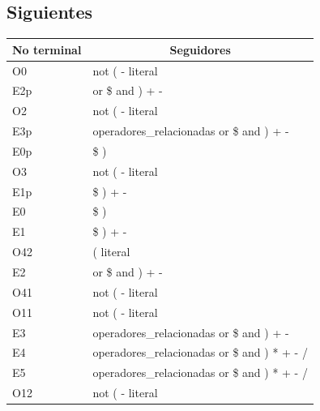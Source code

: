 \documentclass{article}
\begin{document}
\subsection{Siguientes}

\begin{tabular}{|l|l|}
	\hline
	\multicolumn{1}{|c|}{No terminal} & \multicolumn{1}{c|}{Seguidores} \\ \hline
	O0 &	not ( - literal \\ \hline
	E2p &	or \$ and ) + - \\ \hline
	O2 &	not ( - literal \\ \hline
	E3p &	operadores\_relacionadas or \$ and ) + - \\ \hline
	E0p &	\$ ) \\ \hline
	O3 &	not ( - literal \\ \hline
	E1p &	\$ ) + - \\ \hline
	E0 &	\$ ) \\ \hline
	E1 &	\$ ) + - \\ \hline
	O42 &	( literal \\ \hline
	E2 &	or \$ and ) + - \\ \hline
	O41 &	not ( - literal \\ \hline
	O11 &	not ( - literal \\ \hline
	E3 &	operadores\_relacionadas or \$ and ) + - \\ \hline
	E4 &	operadores\_relacionadas or \$ and ) * + - / \\ \hline
	E5 &	operadores\_relacionadas or \$ and ) * + - / \\ \hline
	O12 &	not ( - literal \\ \hline
\end{tabular}
\end{document}
